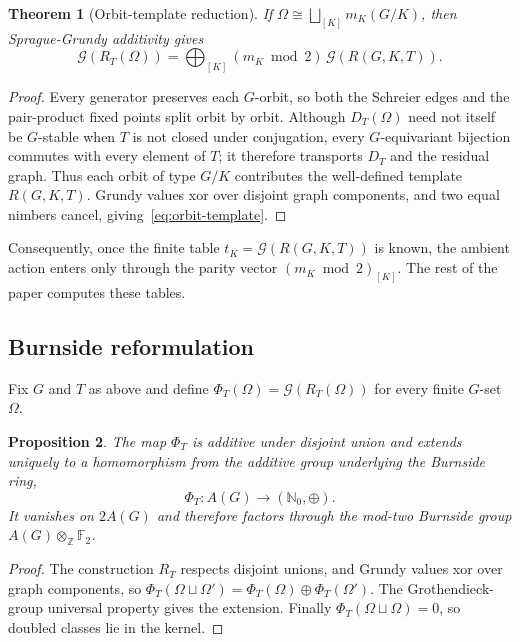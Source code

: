 \documentclass[11pt]{article}
\newtheorem{theorem}{Theorem}[section]
\newtheorem{proposition}[theorem]{Proposition}
\theoremstyle{definition}
\theoremstyle{remark}
\newcommand{\F}{\mathbb{F}}
\newcommand{\Z}{\mathbb{Z}}
\newcommand{\Grundy}{\mathcal{G}}
\begin{document}
\begin{theorem}[Orbit-template reduction]
\label{thm:orbit-template}
If $\Omega\cong\bigsqcup_{[K]}m_K(G/K)$, then Sprague-Grundy additivity gives
\begin{equation}
  \Grundy(R_T(\Omega))=\bigoplus_{[K]}(m_K\bmod 2)\,\Grundy(R(G,K,T)).
  \label{eq:orbit-template}
\end{equation}
\end{theorem}

\begin{proof}
Every generator preserves each $G$-orbit, so both the Schreier edges and the pair-product fixed
points split orbit by orbit. Although $D_T(\Omega)$ need not itself be $G$-stable when $T$ is not
closed under conjugation, every $G$-equivariant bijection commutes with every element of $T$; it
therefore transports $D_T$ and the residual graph. Thus each orbit of type $G/K$ contributes the
well-defined template $R(G,K,T)$. Grundy values xor over disjoint graph components, and two equal
nimbers cancel, giving~\eqref{eq:orbit-template}.
\end{proof}

Consequently, once the finite table $t_K=\Grundy(R(G,K,T))$ is known, the ambient action enters only
through the parity vector $(m_K\bmod 2)_{[K]}$. The rest of the paper computes these tables.

\subsection{Burnside reformulation}

Fix $G$ and $T$ as above and define $\Phi_T(\Omega)=\Grundy(R_T(\Omega))$ for every finite $G$-set
$\Omega$.

\begin{proposition}
\label{prop:burnside}
The map $\Phi_T$ is additive under disjoint union and extends uniquely to a homomorphism from the
additive group underlying the Burnside ring,
\begin{equation}
  \Phi_T:A(G)\longrightarrow(\mathbb N_0,\oplus).
  \label{eq:phi}
\end{equation}
It vanishes on $2A(G)$ and therefore factors through the mod-two Burnside group
$A(G)\otimes_{\Z}\F_2$.
\end{proposition}

\begin{proof}
The construction $R_T$ respects disjoint unions, and Grundy values xor over graph components, so
$\Phi_T(\Omega\sqcup\Omega')=\Phi_T(\Omega)\oplus\Phi_T(\Omega')$. The Grothendieck-group universal
property gives the extension. Finally $\Phi_T(\Omega\sqcup\Omega)=0$, so doubled classes lie in the
kernel.
\end{proof}
\end{document}
